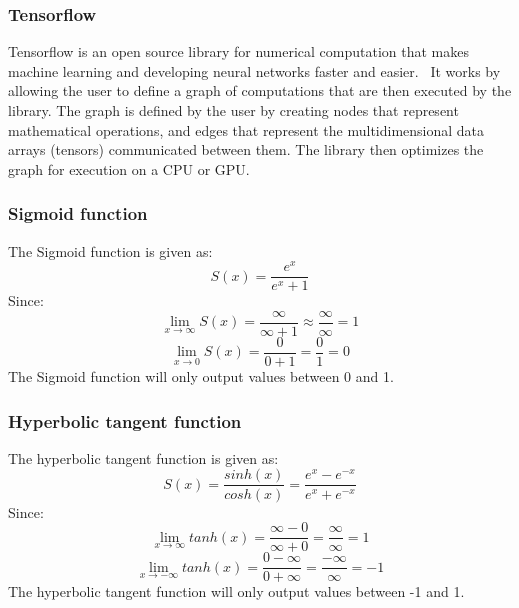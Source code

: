 \subsubsection{Tensorflow}
Tensorflow is an open source library for numerical computation that makes machine learning and developing neural networks faster and easier.~\parencite{yegulalp_2018}
It works by allowing the user to define a graph of computations that are then executed by the library. The graph is defined by the user by creating nodes that represent mathematical operations, and edges that represent the multidimensional data arrays (tensors) communicated between them. 
The library then optimizes the graph for execution on a CPU or GPU.
\subsubsection{Sigmoid function}
The Sigmoid function is given as:
\begin{equation}
    S(x) = \frac{e^x}{e^x+1}
\end{equation}
Since: 
\begin{equation}
    \lim_{x \to \infty}S(x) = \frac{\infty}{\infty+1} \approx \frac{\infty}{\infty} = 1
\end{equation}
\begin{equation}
    \lim_{x \to 0}S(x) = \frac{0}{0+1} = \frac{0}{1} = 0
\end{equation}
The Sigmoid function will only output values between 0 and 1. 
\subsubsection{Hyperbolic tangent function}
The hyperbolic tangent function is given as:
\begin{equation}
    S(x) = \frac{sinh(x)}{cosh(x)} = \frac{e^x-e^{-x}}{e^x+e^{-x}}
\end{equation}
Since:
\begin{equation}
    \lim_{x \to \infty}tanh(x) = \frac{\infty - 0}{\infty + 0} = \frac{\infty}{\infty} = 1
\end{equation}
\begin{equation}
    \lim_{x \to -\infty}tanh(x) = \frac{0 - \infty}{0 + \infty} = \frac{-\infty}{\infty} = -1
\end{equation}
The hyperbolic tangent function will only output values between -1 and 1.
